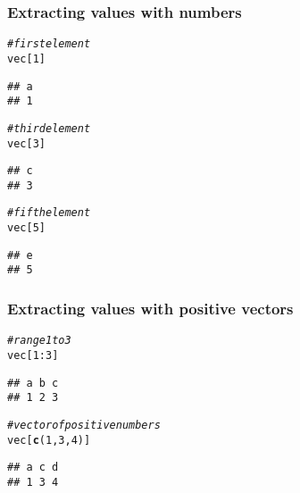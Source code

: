 \documentclass[12pt]{beamer}\usepackage[]{graphicx}\usepackage[]{color}
\makeatletter
\newcommand{\hlnum}[1]{\textcolor[rgb]{0.686,0.059,0.569}{#1}}%
\newcommand{\hlcom}[1]{\textcolor[rgb]{0.678,0.584,0.686}{\textit{#1}}}%
\newcommand{\hlopt}[1]{\textcolor[rgb]{0,0,0}{#1}}%
\newcommand{\hlstd}[1]{\textcolor[rgb]{0.345,0.345,0.345}{#1}}%
\newcommand{\hlkwd}[1]{\textcolor[rgb]{0.737,0.353,0.396}{\textbf{#1}}}%
\newenvironment{kframe}{%
 \def\at@end@of@kframe{}%
 \ifinner\ifhmode%
  \def\at@end@of@kframe{\end{minipage}}%
  \begin{minipage}{\columnwidth}%
 \fi\fi%
 \def\FrameCommand##1{\hskip\@totalleftmargin \hskip-\fboxsep
 \colorbox{shadecolor}{##1}\hskip-\fboxsep
     \hskip-\linewidth \hskip-\@totalleftmargin \hskip\columnwidth}%
 \MakeFramed {\advance\hsize-\width
   \@totalleftmargin\z@ \linewidth\hsize
   \@setminipage}}%
 {\par\unskip\endMakeFramed%
 \at@end@of@kframe}
\newenvironment{knitrout}{}{} %
\makeatother
\begin{document}
\begin{frame}[fragile]
\frametitle{Extracting values with numbers}

\begin{knitrout}\footnotesize
{}\color{fgcolor}\begin{kframe}
\begin{alltt}
\hlcom{# first element }
\hlstd{vec[}\hlnum{1}\hlstd{]}
\end{alltt}
\begin{verbatim}
## a 
## 1
\end{verbatim}
\begin{alltt}
\hlcom{# third element}
\hlstd{vec[}\hlnum{3}\hlstd{]}
\end{alltt}
\begin{verbatim}
## c 
## 3
\end{verbatim}
\begin{alltt}
\hlcom{# fifth element}
\hlstd{vec[}\hlnum{5}\hlstd{]}
\end{alltt}
\begin{verbatim}
## e 
## 5
\end{verbatim}
\end{kframe}
\end{knitrout}

\end{frame}


\begin{frame}[fragile]
\frametitle{Extracting values with positive vectors}

\begin{knitrout}\footnotesize
{}\color{fgcolor}\begin{kframe}
\begin{alltt}
\hlcom{# range 1 to 3}
\hlstd{vec[}\hlnum{1}\hlopt{:}\hlnum{3}\hlstd{]}
\end{alltt}
\begin{verbatim}
## a b c 
## 1 2 3
\end{verbatim}
\begin{alltt}
\hlcom{# vector of positive numbers}
\hlstd{vec[}\hlkwd{c}\hlstd{(}\hlnum{1}\hlstd{,} \hlnum{3}\hlstd{,} \hlnum{4}\hlstd{)]}
\end{alltt}
\begin{verbatim}
## a c d 
## 1 3 4
\end{verbatim}
\end{kframe}
\end{knitrout}

\end{frame}
\end{document}
